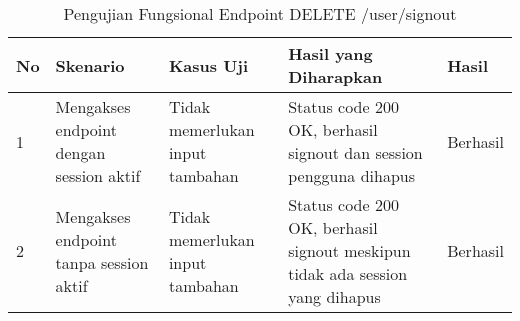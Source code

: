 \begin{table}[H]
    \centering
    \begin{tabular}{|p{0.5cm}|p{3cm}|p{5cm}|p{5cm}|p{1.5cm}|}
        \hline
        \rowcolor[HTML]{DAE8FC} 
        \textbf{No} & \textbf{Skenario} & \textbf{Kasus Uji} & \textbf{Hasil yang Diharapkan} & \textbf{Hasil} \\ \hline
        1 & Mengakses endpoint dengan session aktif & 
        Tidak memerlukan input tambahan & 
        Status code 200 OK, berhasil signout dan session pengguna dihapus & 
        Berhasil \\ \hline
        2 & Mengakses endpoint tanpa session aktif & 
        Tidak memerlukan input tambahan & 
        Status code 200 OK, berhasil signout meskipun tidak ada session yang dihapus & 
        Berhasil \\ \hline
    \end{tabular}
    \caption{Pengujian Fungsional Endpoint DELETE /user/signout}
    \label{tab:user_signout_testing}
\end{table}

